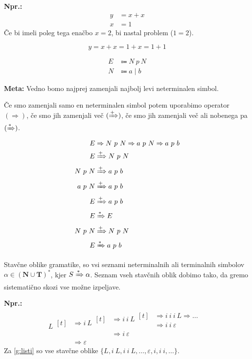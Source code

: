 \documentclass{article}
\newcommand{\Ex}{\textbf{Npr.:}\ }
\newcommand{\Special}[1]{\textbf{#1}}
\newcommand{\Set}[1]{\mathbf{#1}}
\newcommand{\Grammar}{G}
\newcommand{\Terminals}{\Set{T}}
\newcommand{\NonTerminals}{\Set{N}}
\newcommand{\StartSymbol}{S}
\newcommand{\Null}{\varepsilon}
\newcommand{\Arrow}{\Coloneqq}
\newcommand{\Derive}{\Rightarrow}
\newcommand{\DeriveStar}{\xRightarrow{\ast}}
\newcommand{\DerivePlus}{\xRightarrow{+}}
\newcommand{\Seq}{\ }
\newcommand{\Union}{\mathrel{|}}
\newcommand{\Kleene}[1]{#1^\ast}
\begin{document}
\Ex
  \begin{align*}
    y &= x + x\\
    x &= 1
  \end{align*}
  Če bi imeli poleg tega enačbo $x = 2$, bi nastal problem ($1 = 2$).

  \begin{equation*}
    y = x + x = 1 + x = 1 + 1
  \end{equation*}

  \begin{equation}
    \tag{$\Grammar_2$}
    \label{g:plusab}
    \begin{aligned}
      E &\Arrow N \Seq p \Seq N\\
      N &\Arrow a \Union b
    \end{aligned}
  \end{equation}

\Special{Meta:} Vedno bomo najprej zamenjali najbolj levi neterminalen simbol.

Če smo zamenjali samo en neterminalen simbol potem uporabimo operator $(\Derive)$, če smo jih zamenjali več $(\DerivePlus)$, če smo jih zamenjali več ali nobenega pa $(\DeriveStar)$.
  \begin{align*}
    E &\Derive N \Seq p \Seq N \Derive a \Seq p \Seq N \Derive a \Seq p \Seq b \\
    E &\DerivePlus N \Seq p \Seq N\\
    N \Seq p \Seq N &\DerivePlus a \Seq p \Seq b\\
    a \Seq p \Seq N &\DerivePlus a \Seq p \Seq b\\
    E &\DerivePlus a \Seq p \Seq b\\
    E &\DeriveStar E\\
    N \Seq p \Seq N &\DerivePlus N \Seq p \Seq N\\
    E &\DeriveStar a \Seq p \Seq b
  \end{align*}

Stavčne oblike gramatike, so vsi seznami neterminalnih ali terminalnih simbolov $\alpha \in \Kleene{(\NonTerminals \cup \Terminals)}$, kjer $\StartSymbol \DeriveStar \alpha$.
Seznam vseh stavčnih oblik dobimo tako, da gremo sistematično skozi vse možne izpeljave.

\Ex
  \begin{equation*}
    L \begin{aligned}[t]
      &\Derive i \Seq L \begin{aligned}[t]
        &\Derive i \Seq i \Seq L \begin{aligned}[t]
          &\Derive i \Seq i \Seq i \Seq L \Derive \dots\\
          &\Derive i \Seq i \Seq \Null 
        \end{aligned}\\
        &\Derive i \Seq \Null 
      \end{aligned}\\
      &\Derive \Null
    \end{aligned}
  \end{equation*}
Za \ref{g:listi} so vse stavčne oblike $\{L, i \Seq L, i \Seq i \Seq L, \dots, \Null, i, i \Seq i, \dots\}$.
\end{document}
